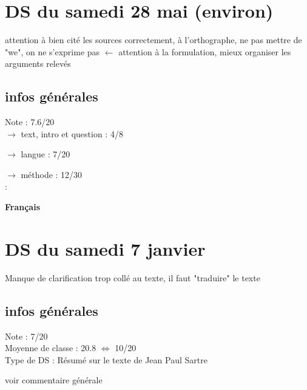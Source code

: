 \documentclass{book}
\begin{document}
\section{DS du samedi 28 mai (environ)}

\begin{tcolorbox}[width={14cm},colback={yellow!20!white},title={\textbf{Commentaire générale sur ce DM}},colbacktitle=red!40!white,coltitle=black]    
	attention à bien cité les sources correctement, à l'orthographe, ne pas mettre de "we", on ne s'exprime pas $\leftarrow$ attention à la formulation, mieux organiser les arguments relevés
\end{tcolorbox}

\subsection{infos générales}

Note : 7.6/20 \\

$\rightarrow$ text, intro et question : 4/8

$\rightarrow$ langue : 7/20

$\rightarrow$ méthode : 12/30 \\:








\begin{center}
\textbf{\large Français}
\end{center}

\vspace{0.6cm}

\section{DS du samedi 7 janvier}

\begin{tcolorbox}[width={14cm},colback={yellow!20!white},title={\textbf{Commentaire générale sur ce Résumé}},colbacktitle=red!40!white,coltitle=black]    
	Manque de clarification trop collé au texte, il faut "traduire" le texte
\end{tcolorbox}

\subsection{infos générales}

Note : 7/20 \\

Moyenne de classe : 20.8 $\Leftrightarrow$ 10/20 \\

Type de DS : Résumé sur le texte de Jean Paul Sartre

voir commentaire générale
\end{document}
